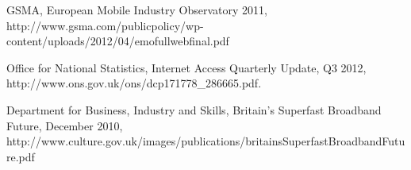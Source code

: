 \documentclass[journal]{IEEEtran}
\begin{document}
%
%
%
\begin{thebibliography}{1}

GSMA, European Mobile Industry Observatory 2011, http://www.gsma.com/publicpolicy/wp-content/uploads/2012/04/emofullwebfinal.pdf

Office for National Statistics, Internet Access Quarterly Update, Q3 2012, http://www.ons.gov.uk/ons/dcp171778_286665.pdf.

Department for Business, Industry and Skills, Britain’s Superfast Broadband Future, December 2010, 
http://www.culture.gov.uk/images/publications/britainsSuperfastBroadbandFuture.pdf

\end{thebibliography}
\end{document}
